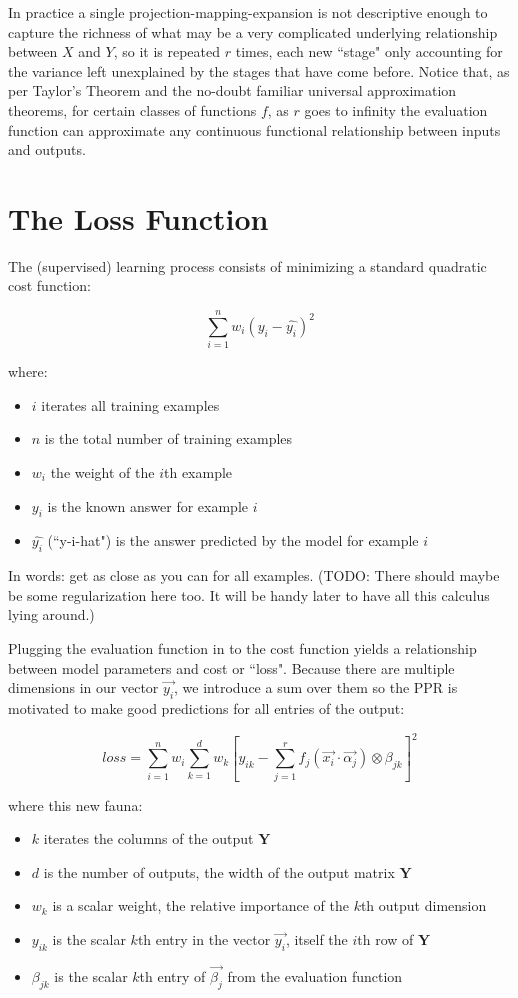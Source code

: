 \documentclass[12pt]{article}
\begin{document}
In practice a single projection-mapping-expansion is not descriptive enough to capture the richness of what may be a very complicated underlying relationship between $X$ and $Y$, so it is repeated $r$ times, each new ``stage" only accounting for the variance left unexplained by the stages that have come before. Notice that, as per Taylor's Theorem and the no-doubt familiar universal approximation theorems, for certain classes of functions $f$, as $r$ goes to infinity the evaluation function can approximate any continuous functional relationship between inputs and outputs.

\section{The Loss Function}

The (supervised) learning process consists of minimizing a standard quadratic cost function:

$$\sum_{i=1}^n w_i (y_i - \hat{y_i})^2$$

where:
\begin{itemize}
	\setlength\itemsep{-2mm}
	\item $i$ iterates all training examples
	\item $n$ is the total number of training examples
	\item $w_i$ the weight of the $i$th example
	\item $y_i$ is the known answer for example $i$
	\item $\hat{y_i}$ (``y-i-hat") is the answer predicted by the model for example $i$
\end{itemize}

In words: get as close as you can for all examples. (TODO: There should maybe be some regularization here too. It will be handy later to have all this calculus lying around.)

Plugging the evaluation function in to the cost function yields a relationship between model parameters and cost or ``loss". Because there are multiple dimensions in our vector $\vec{y_i}$, we introduce a sum over them so the PPR is motivated to make good predictions for all entries of the output:

$$loss = \sum_{i=1}^n w_i \sum_{k=1}^d w_k [y_{ik} - \sum_{j=1}^r f_j(\vec{x_i} \cdot \vec{\alpha_j}) \otimes \beta_{jk}]^2$$

where this new fauna:
\begin{itemize}
	\setlength\itemsep{-2mm}
	\item $k$ iterates the columns of the output $\pmb{Y}$
	\item $d$ is the number of outputs, the width of the output matrix $\pmb{Y}$
	\item $w_k$ is a scalar weight, the relative importance of the $k$th output dimension
	\item $y_{ik}$ is the scalar $k$th entry in the vector $\vec{y_i}$, itself the $i$th row of $\pmb{Y}$
	\item $\beta_{jk}$ is the scalar $k$th entry of $\vec{\beta_j}$ from the evaluation function
\end{itemize}
\end{document}
